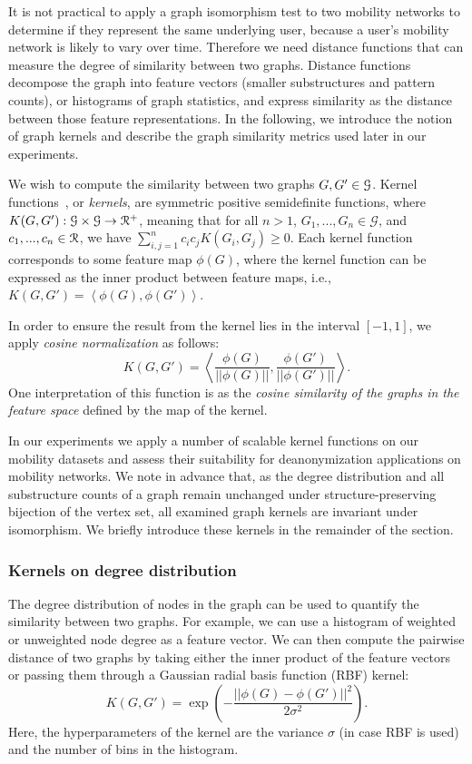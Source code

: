 It is not practical to apply a graph isomorphism test to two mobility networks to determine if they represent the same underlying user, because a user's mobility network is likely to vary over time.
Therefore we need distance functions that can measure the degree of similarity between two graphs.
Distance functions decompose the graph into feature vectors (smaller substructures and pattern counts), or histograms of graph statistics, and express similarity as the distance between those feature representations.
In the following, we introduce the notion of graph kernels and describe the graph similarity metrics used later in our experiments.

We wish to compute the similarity between two graphs $ G, G' \in \mathcal{G}$. Kernel functions~\cite{Vishwanathan2010}, or \emph{kernels}, are symmetric positive semidefinite functions, where  $ K(G, G') : \mathcal{G} \times \mathcal{G} \rightarrow \mathcal{R}^{+} $, meaning
that for all $ n > 1 $,  $ G_1, . . . , G_n \in \mathcal{G} $, and $ c_1, . . . , c_n \in \mathcal{R}$, we have $ {\sum_{i,j=1}^{n} c_ic_jK(G_i, G_j ) \geq 0} $.
Each kernel function corresponds to some feature map $ \phi(G) $, where the
kernel function can be expressed as the inner product between feature maps, i.e., $ K(G, G') = \left \langle \phi(G), \phi(G') \right \rangle$.

In order to ensure the result from the kernel lies in the interval $[-1, 1]$, we apply \emph{cosine normalization} as follows:
\[
K({G}, {G}')=\left  \langle \frac{\phi({G})}{||\phi({G})||}, \frac{\phi(G')}{||\phi(G')||} \right  \rangle.
\]
One interpretation of this function is as the \emph{cosine similarity of the graphs in the feature space} defined by the map of the kernel.

In our experiments we apply a number of scalable kernel functions on our mobility datasets and assess their suitability for deanonymization applications on mobility networks.
We note in advance that, as the degree distribution and all substructure counts of a graph remain unchanged under structure-preserving bijection of the vertex set, all examined graph kernels are invariant under isomorphism.
We briefly introduce these kernels in the remainder of the section.


\subsubsection{Kernels on degree distribution }

The degree distribution of nodes in the graph can be used to quantify the similarity between two graphs.
For example, we can use a histogram of weighted or unweighted node degree as a feature vector.
We can then compute the pairwise distance of two graphs by taking either the inner product of the feature vectors or passing them through a Gaussian radial basis function (RBF) kernel:
\[ K(G,G') =\exp\left( -\frac{||\phi(G) - \phi(G')||^2}{2\sigma^2} \right).\]
Here, the hyperparameters of the kernel are the variance $ \sigma $ (in case RBF is used) and the number of bins in the histogram.

